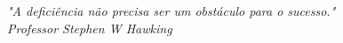 \begin{epigrafe}
    \vspace*{\fill}
	\begin{flushright}

		\textit{"A deficiência não precisa ser um obstáculo para o sucesso."\\
		Professor Stephen W Hawking}
	\end{flushright}
\end{epigrafe}
